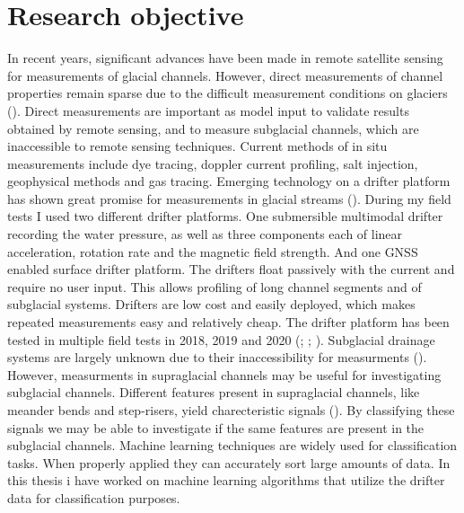 \section{Research objective}
In recent years, significant advances have been made in remote satellite sensing for measurements of glacial channels. However, direct measurements of channel properties remain sparse due to the difficult measurement conditions on glaciers (\cite{gleason_2016}). Direct measurements are important as model input to validate results obtained by remote sensing, and to measure subglacial channels, which are inaccessible to remote sensing techniques. Current methods of in situ measurements include dye tracing, doppler current profiling, salt injection, geophysical methods and gas tracing. Emerging technology on a drifter platform has shown great promise for measurements in glacial streams (\cite{pressure_inertia}). 
\newline
\newline
During my field tests I used two different drifter platforms. One submersible multimodal drifter recording the water pressure, as well as three components each of linear acceleration, rotation rate and the magnetic field strength. And one GNSS enabled surface drifter platform. The drifters float passively with the current and require no user input. This allows profiling of long channel segments and of subglacial systems. Drifters are low cost and easily deployed, which makes repeated measurements easy and relatively cheap. The drifter platform has been tested in multiple field tests in 2018, 2019 and 2020  (\cite{pressure_inertia}; \cite{multiscale_change}; \cite{topology_and_pressure}).
\newline
\newline
Subglacial drainage systems are largely unknown due to their inaccessibility for measurments (\cite{pressure_inertia}). However, measurments in supraglacial channels may be useful for investigating subglacial channels. Different features present in supraglacial channels, like meander bends and step-risers, yield charecteristic signals (\cite{multiscale_change}). By classifying these signals we may be able to investigate if the same features are present in the subglacial channels. Machine learning techniques are widely used for classification tasks. When properly applied they can accurately sort large amounts of data. In this thesis i have worked on machine learning algorithms that utilize the drifter data for classification purposes.

